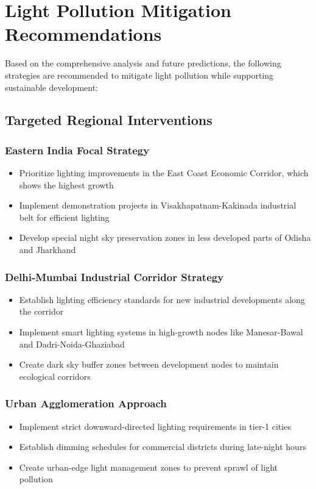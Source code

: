 \documentclass[12pt,a4paper]{article}
\begin{document}
\section{Light Pollution Mitigation Recommendations}

Based on the comprehensive analysis and future predictions, the following strategies are recommended to mitigate light pollution while supporting sustainable development:

\subsection{Targeted Regional Interventions}

\subsubsection{Eastern India Focal Strategy}
\begin{itemize}
    \item Prioritize lighting improvements in the East Coast Economic Corridor, which shows the highest growth
    \item Implement demonstration projects in Visakhapatnam-Kakinada industrial belt for efficient lighting
    \item Develop special night sky preservation zones in less developed parts of Odisha and Jharkhand
\end{itemize}

\subsubsection{Delhi-Mumbai Industrial Corridor Strategy}
\begin{itemize}
    \item Establish lighting efficiency standards for new industrial developments along the corridor
    \item Implement smart lighting systems in high-growth nodes like Manesar-Bawal and Dadri-Noida-Ghaziabad
    \item Create dark sky buffer zones between development nodes to maintain ecological corridors
\end{itemize}

\subsubsection{Urban Agglomeration Approach}
\begin{itemize}
    \item Implement strict downward-directed lighting requirements in tier-1 cities
    \item Establish dimming schedules for commercial districts during late-night hours
    \item Create urban-edge light management zones to prevent sprawl of light pollution
\end{itemize}
\end{document}
